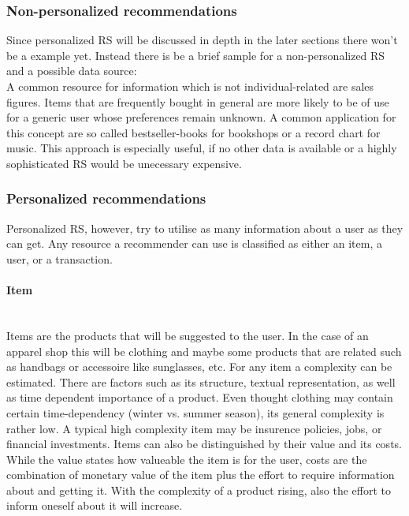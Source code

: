 \subsubsection{Non-personalized recommendations}
Since personalized RS will be discussed in depth in the later sections there won't be a example yet.
Instead there is be a brief sample for a non-personalized RS and a possible data source:
\\
A common resource for information which is not individual-related are sales figures.
Items that are frequently bought in general are more likely to be of use for a generic user whose preferences remain unknown.
\citep[p.~10-11]{ricci:2011}
A common application for this concept are so called bestseller-books for bookshops or a record chart for music.
This approach is especially useful, if no other data is available or a highly sophisticated RS would be unecessary expensive.

\subsubsection{Personalized recommendations}
Personalized RS, however, try to utilise as many information about a user as they can get.
Any resource a recommender can use is classified as either an item, a user, or a transaction.

\paragraph{Item}~\\
Items are the products that will be suggested to the user.
In the case of an apparel shop this will be clothing and maybe some products that are related such as handbags or accessoire like sunglasses, etc.
For any item a complexity can be estimated.
There are factors such as its structure, textual representation, as well as time dependent importance of a product.
Even thought clothing may contain certain time-dependency (winter vs. summer season), its general complexity is rather low.
A typical high complexity item may be insurence policies, jobs, or financial investments.
Items can also be distinguished by their value and its costs.
While the value states how valueable the item is for the user, costs are the combination of monetary value of the item plus the effort to require information about and getting it.
With the complexity of a product rising, also the effort to inform oneself about it will increase.
\citep[p.~8]{ricci:2011}

